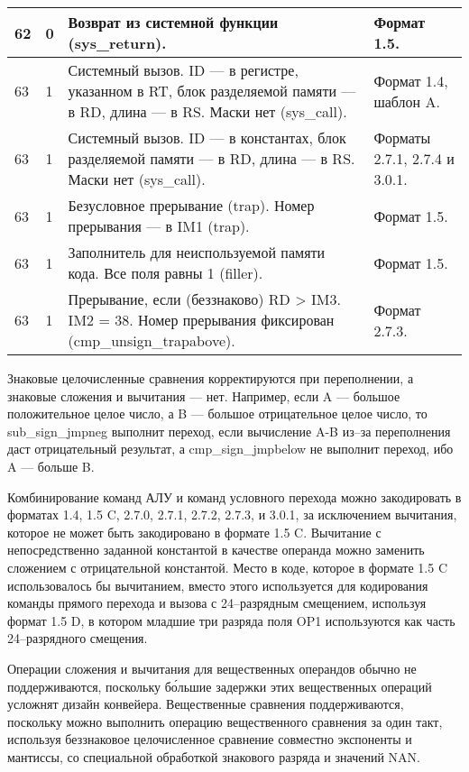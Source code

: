 \documentclass[forwardcom.tex]{subfiles}
\begin{document}
\begin{longtable}{|p{10mm}|p{18mm}|p{80mm}|p{35mm}|}
62 & 0 & Возврат из системной функции (sys\_return). & Формат 1.5.  \\ \hline
63 & 1 & Системный вызов. ID --- в регистре, указанном в RT, блок разделяемой памяти --- в RD, длина --- в RS. Маски нет (sys\_call). & Формат 1.4, шаблон A. \\ \hline
63 & 1 & Системный вызов. ID --- в константах, блок разделяемой памяти --- в RD, длина --- в RS. Маски нет (sys\_call). & Форматы 2.7.1, 2.7.4 и 3.0.1. \\ \hline
63 & 1 & Безусловное прерывание (trap). Номер прерывания --- в IM1 (trap). & Формат 1.5. \\ \hline
63 & 1 & Заполнитель для неиспользуемой памяти кода. Все поля равны 1 (filler). & Формат 1.5. \\ \hline
63 & 1 & Прерывание, если (беззнаково) RD \textgreater{} IM3. IM2 = 38. Номер прерывания фиксирован (cmp\_unsign\_trapabove). & Формат 2.7.3. \\ \hline
\end{longtable}

Знаковые целочисленные сравнения корректируются при переполнении, а знаковые сложения и вычитания --- нет. Например, если A --- большое положительное целое число, а B --- большое отрицательное целое число, то  sub\_sign\_jmpneg выполнит переход, если вычисление  A-B из--за переполнения даст отрицательный результат, а cmp\_sign\_jmpbelow не выполнит переход, ибо A --- больше B.

Комбинирование команд АЛУ и команд условного перехода можно закодировать в форматах 1.4, 1.5 C, 2.7.0, 2.7.1, 2.7.2, 2.7.3, и 3.0.1, за исключением вычитания, которое не может быть закодировано в формате 1.5 C. Вычитание с непосредственно заданной константой в качестве операнда можно заменить сложением с отрицательной константой. Место в коде, которое в формате 1.5 C использовалось бы вычитанием, вместо этого используется для кодирования команды прямого перехода и вызова с 24--разрядным смещением, используя формат 1.5 D, в котором младшие три разряда поля OP1 используются как часть 24--разрядного смещения.

Операции сложения и вычитания для вещественных операндов обычно не поддерживаются, поскольку б\'{о}льшие задержки этих вещественных операций усложнят дизайн конвейера. Вещественные сравнения поддерживаются, поскольку можно выполнить операцию вещественного сравнения за один такт, используя беззнаковое целочисленное сравнение совместно экспоненты и мантиссы, со специальной обработкой знакового разряда и значений NAN.
\end{document}
